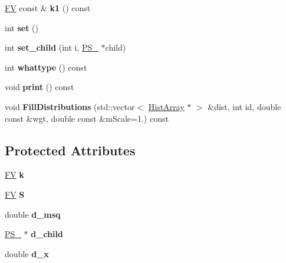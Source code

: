\begin{DoxyCompactItemize}
\item 
\hypertarget{classPS__2__1_a8896fae62d323bceb002628a95466f3f}{\hyperlink{classFV}{F\-V} const \& {\bfseries k1} () const }\label{classPS__2__1_a8896fae62d323bceb002628a95466f3f}

\item 
\hypertarget{classPS__2__1_a02e613ae4acac6c2ea9c57a49a8e3f68}{int {\bfseries set} ()}\label{classPS__2__1_a02e613ae4acac6c2ea9c57a49a8e3f68}

\item 
\hypertarget{classPS__2__1_a3bcae5991298ad9a2fc143d4461c60fa}{int {\bfseries set\-\_\-child} (int i, \hyperlink{classPS__2}{P\-S\-\_} $\ast$child)}\label{classPS__2__1_a3bcae5991298ad9a2fc143d4461c60fa}

\item 
\hypertarget{classPS__2__1_aaa0d8ed0b5e2673cb5f2cd84f090e1f9}{int {\bfseries whattype} () const }\label{classPS__2__1_aaa0d8ed0b5e2673cb5f2cd84f090e1f9}

\item 
\hypertarget{classPS__2__1_a21760964ae4b35c2cfeff16b4c569c3a}{void {\bfseries print} () const }\label{classPS__2__1_a21760964ae4b35c2cfeff16b4c569c3a}

\item 
\hypertarget{classPS__2__1_af20aba9c6be7e4c293f1919c702a53e7}{void {\bfseries Fill\-Distributions} (std\-::vector$<$ \hyperlink{classHistArray}{Hist\-Array} $\ast$ $>$ \&dist, int id, double const \&wgt, double const \&m\-Scale=1.) const }\label{classPS__2__1_af20aba9c6be7e4c293f1919c702a53e7}

\end{DoxyCompactItemize}
\subsection*{Protected Attributes}
\begin{DoxyCompactItemize}
\item 
\hypertarget{classPS__2__1_a3606766aee8e4775462c15adda3acbc5}{\hyperlink{classFV}{F\-V} {\bfseries k}}\label{classPS__2__1_a3606766aee8e4775462c15adda3acbc5}

\item 
\hypertarget{classPS__2__1_a621e0e169e90c4ea5545f8b340d86ed9}{\hyperlink{classFV}{F\-V} {\bfseries S}}\label{classPS__2__1_a621e0e169e90c4ea5545f8b340d86ed9}

\item 
\hypertarget{classPS__2__1_a415b225aedab250a67aee39ef0d859bc}{double {\bfseries d\-\_\-msq}}\label{classPS__2__1_a415b225aedab250a67aee39ef0d859bc}

\item 
\hypertarget{classPS__2__1_a015027e1fc8e30949ea8a439cfedddd4}{\hyperlink{classPS__2}{P\-S\-\_} $\ast$ {\bfseries d\-\_\-child}}\label{classPS__2__1_a015027e1fc8e30949ea8a439cfedddd4}

\item 
\hypertarget{classPS__2__1_af18aa8f6679b7ac65be236b00e794e0c}{double {\bfseries d\-\_\-x}}\label{classPS__2__1_af18aa8f6679b7ac65be236b00e794e0c}

\end{DoxyCompactItemize}
